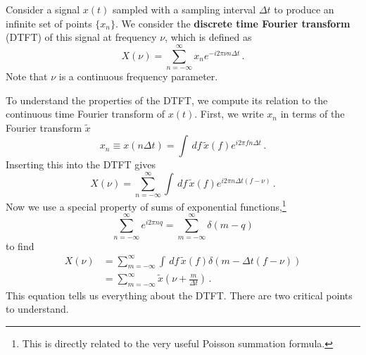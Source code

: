 Consider a signal $x(t)$ sampled with a sampling interval $\Delta t$ to produce an infinite set of points $\{ x_n \}$.
We consider the \textbf{discrete time Fourier transform} (DTFT) of this signal at frequency $\nu$, which is defined as
\begin{equation}
X(\nu) =\sum_{n=-\infty}^\infty x_n e^{-i 2\pi \nu n \Delta t} \, .
\end{equation}
Note that $\nu$ is a continuous frequency parameter.

To understand the properties of the DTFT, we compute its relation to the continuous time Fourier transform of $x(t)$.
First, we write $x_n$ in terms of the Fourier transform $\tilde{x}$
\begin{equation}
x_n \equiv x(n \Delta t) = \int \, df \, \tilde{x}(f) e^{i 2 \pi f n \Delta t} \, .
\end{equation}
Inserting this into the DTFT gives
\begin{equation}
X(\nu) = \sum_{n=-\infty}^\infty \int \, df \,
\tilde{x}(f) e^{i 2 \pi n \Delta t (f - \nu)} \, .
\end{equation}
Now we use a special property of sums of exponential functions,\footnote{This is directly related to the very useful Poisson summation formula.}
\begin{equation}
\sum_{n=-\infty}^\infty e^{i 2 \pi n q} =
\sum_{m=-\infty}^\infty \delta (m - q)
\end{equation}
to find
\begin{align}
X(\nu)
&= \sum_{m=-\infty}^\infty \int \, df \, \tilde{x}(f) \delta( m - \Delta t (f - \nu) ) \nonumber \\
&= \sum_{m=-\infty}^\infty \tilde{x} \left( \nu + \frac{m}{\Delta t} \right) \, .
\end{align}
This equation tells us everything about the DTFT.
There are two critical points to understand.

